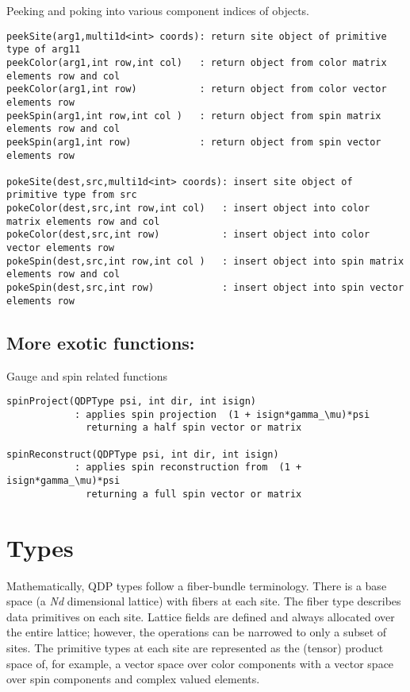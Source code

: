 \documentclass[12pt,letterpaper]{article}
\begin{document}
Peeking and poking into various component indices of objects.

\begin{verbatim}
peekSite(arg1,multi1d<int> coords): return site object of primitive type of arg11
peekColor(arg1,int row,int col)   : return object from color matrix elements row and col
peekColor(arg1,int row)           : return object from color vector elements row
peekSpin(arg1,int row,int col )   : return object from spin matrix elements row and col
peekSpin(arg1,int row)            : return object from spin vector elements row

pokeSite(dest,src,multi1d<int> coords): insert site object of primitive type from src
pokeColor(dest,src,int row,int col)   : insert object into color matrix elements row and col
pokeColor(dest,src,int row)           : insert object into color vector elements row
pokeSpin(dest,src,int row,int col )   : insert object into spin matrix elements row and col
pokeSpin(dest,src,int row)            : insert object into spin vector elements row
\end{verbatim}


\medskip

\subsection{More exotic functions:}
\label{sec:otherfuncs}

Gauge and spin related functions

\begin{verbatim}
spinProject(QDPType psi, int dir, int isign)
		    : applies spin projection  (1 + isign*gamma_\mu)*psi
		      returning a half spin vector or matrix

spinReconstruct(QDPType psi, int dir, int isign)
		    : applies spin reconstruction from  (1 + isign*gamma_\mu)*psi
		      returning a full spin vector or matrix
\end{verbatim}

\bigskip


\newpage
\section{Types}

Mathematically, QDP types follow a fiber-bundle terminology.  There is
a base space (a {\em Nd} dimensional lattice) with fibers at each site.  The
fiber type describes data primitives on each site.  Lattice fields are
defined and always allocated over the entire lattice; however, the
operations can be narrowed to only a subset of sites.  The primitive
types at each site are represented as the (tensor) product space of,
for example, a vector space over color components with a vector space
over spin components and complex valued elements.
\end{document}

